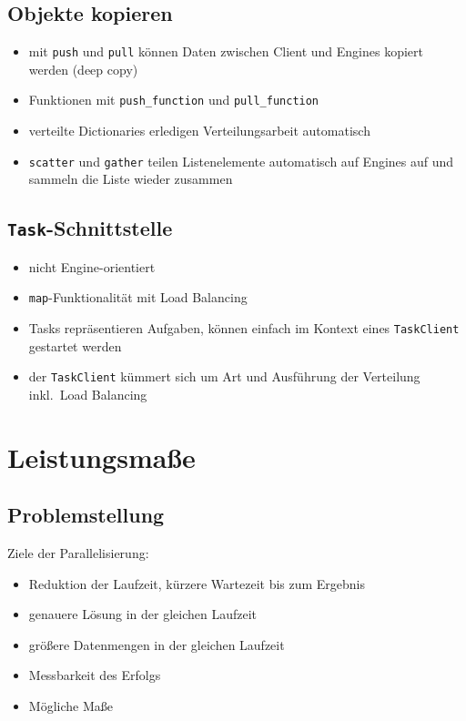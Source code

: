 \documentclass[a4paper, 12pt]{article}
\begin{document}
\subsection{Objekte kopieren}
\begin{itemize}
  \item mit \texttt{push} und \texttt{pull} können Daten zwischen Client und Engines kopiert werden (deep copy)
  \item Funktionen mit \texttt{push\_function} und \texttt{pull\_function}
  \item verteilte Dictionaries erledigen Verteilungsarbeit automatisch
  \item \texttt{scatter} und \texttt{gather} teilen Listenelemente automatisch auf Engines auf und sammeln die Liste wieder zusammen
\end{itemize}


\subsection{\texttt{Task}-Schnittstelle}
\begin{itemize}
  \item nicht Engine-orientiert
  \item \texttt{map}-Funktionalität mit Load Balancing
  \item Tasks repräsentieren Aufgaben, können einfach im Kontext eines \texttt{TaskClient} gestartet werden
  \item der \texttt{TaskClient} kümmert sich um Art und Ausführung der Verteilung inkl.\ Load Balancing
\end{itemize}



\section{Leistungsmaße}


\subsection{Problemstellung}
Ziele der Parallelisierung:
\begin{itemize}
  \item Reduktion der Laufzeit, kürzere Wartezeit bis zum Ergebnis
  \item genauere Lösung in der gleichen Laufzeit
  \item größere Datenmengen in der gleichen Laufzeit
\end{itemize}
\begin{itemize}
  \renewcommand{\labelitemi}{\Large{?}}%
  \item Messbarkeit des Erfolgs
  \item Mögliche Maße
\end{itemize}
\end{document}
